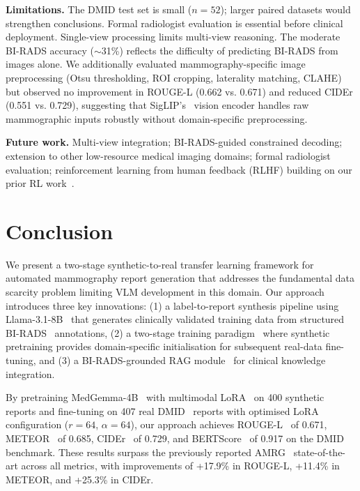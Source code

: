 \documentclass{wlscirep}
\begin{document}
\textbf{Limitations.} The DMID test set is small ($n=52$); larger paired datasets would strengthen conclusions. Formal radiologist evaluation is essential before clinical deployment. Single-view processing limits multi-view reasoning. The moderate BI-RADS accuracy ($\sim$31\%) reflects the difficulty of predicting BI-RADS from images alone. We additionally evaluated mammography-specific image preprocessing (Otsu thresholding, ROI cropping, laterality matching, CLAHE) but observed no improvement in ROUGE-L (0.662 vs. 0.671) and reduced CIDEr (0.551 vs. 0.729), suggesting that SigLIP's~\cite{zoph2020siglip} vision encoder handles raw mammographic inputs robustly without domain-specific preprocessing.

\textbf{Future work.} Multi-view integration; BI-RADS-guided constrained decoding; extension to other low-resource medical imaging domains; formal radiologist evaluation; reinforcement learning from human feedback (RLHF) building on our prior RL work~\cite{esen2025rl}.

\section*{Conclusion}

We present a two-stage synthetic-to-real transfer learning framework for automated mammography report generation that addresses the fundamental data scarcity problem limiting VLM development in this domain. Our approach introduces three key innovations: (1) a label-to-report synthesis pipeline using Llama-3.1-8B~\cite{dubey2024llama3} that generates clinically validated training data from structured BI-RADS~\cite{birads2013} annotations, (2) a two-stage training paradigm~\cite{pan2010transfer} where synthetic pretraining provides domain-specific initialisation for subsequent real-data fine-tuning, and (3) a BI-RADS-grounded RAG module~\cite{lewis2020rag} for clinical knowledge integration.

By pretraining MedGemma-4B~\cite{lin2024medgemma} with multimodal LoRA~\cite{hu2022lora} on 400 synthetic reports and fine-tuning on 407 real DMID~\cite{oza2024} reports with optimised LoRA configuration ($r=64$, $\alpha=64$), our approach achieves ROUGE-L~\cite{lin2004rouge} of 0.671, METEOR~\cite{banerjee2005meteor} of 0.685, CIDEr~\cite{vedantam2015cider} of 0.729, and BERTScore~\cite{zhang2020bertscore} of 0.917 on the DMID benchmark. These results surpass the previously reported AMRG~\cite{sung2025} state-of-the-art across all metrics, with improvements of +17.9\% in ROUGE-L, +11.4\% in METEOR, and +25.3\% in CIDEr.
\end{document}
